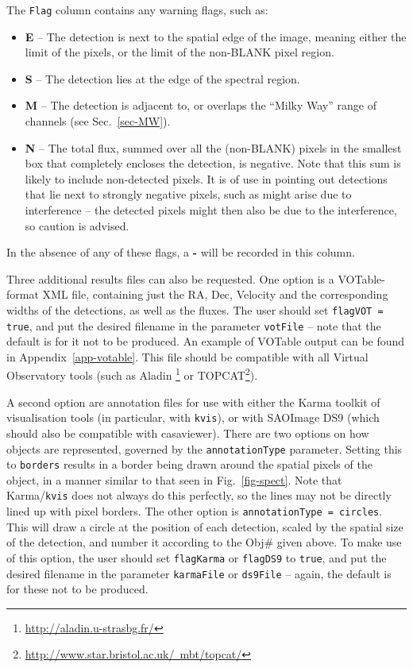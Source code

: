 The \texttt{Flag} column contains any warning flags, such as:
\begin{itemize}
\item \textbf{E} -- The detection is next to the spatial edge of the image,
meaning either the limit of the pixels, or the limit of the non-BLANK
pixel region.
\item \textbf{S} -- The detection lies at the edge of the spectral region.
\item \textbf{M} -- The detection is adjacent to, or overlaps the
  ``Milky Way'' range of channels (see Sec.~\ref{sec-MW}).
\item \textbf{N} -- The total flux, summed over all the (non-BLANK)
pixels in the smallest box that completely encloses the detection, is
negative. Note that this sum is likely to include non-detected
pixels. It is of use in pointing out detections that lie next to
strongly negative pixels, such as might arise due to interference --
the detected pixels might then also be due to the interference, so
caution is advised.
\end{itemize}
In the absence of any of these flags, a \textbf{-} will be recorded in
this column.


Three additional results files can also be requested. One option is a
VOTable-format XML file, containing just the RA, Dec, Velocity and the
corresponding widths of the detections, as well as the fluxes. The
user should set \texttt{flagVOT = true}, and put the desired filename
in the parameter \texttt{votFile} -- note that the default is for it
not to be produced. An example of VOTable output can be found in
Appendix~\ref{app-votable}.  This file should be compatible with all
Virtual Observatory tools (such as Aladin%
\footnote{%
  \href{http://aladin.u-strasbg.fr/}{http://aladin.u-strasbg.fr/}} or
TOPCAT\footnote{%
  \href{http://www.star.bristol.ac.uk/~mbt/topcat/}%
  {http://www.star.bristol.ac.uk/~mbt/topcat/}}).

A second option are annotation files for use with either the Karma
toolkit of visualisation tools (in particular, with \texttt{kvis}), or
with SAOImage DS9 (which should also be compatible with
casaviewer). There are two options on how objects are represented,
governed by the \texttt{annotationType} parameter. Setting this to
\texttt{borders} results in a border being drawn around the spatial
pixels of the object, in a manner similar to that seen in
Fig.~\ref{fig-spect}. Note that Karma/\texttt{kvis} does not always do
this perfectly, so the lines may not be directly lined up with pixel
borders. The other option is \texttt{annotationType = circles}. This
will draw a circle at the position of each detection, scaled by the
spatial size of the detection, and number it according to the Obj\#
given above. To make use of this option, the user should set
\texttt{flagKarma} or \texttt{flagDS9} to \texttt{true}, and put the
desired filename in the parameter \texttt{karmaFile} or
\texttt{ds9File} -- again, the default is for these not to be produced.

